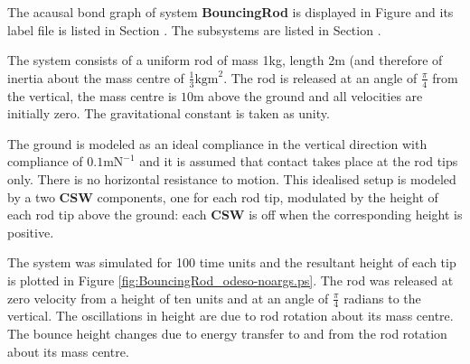 
%

The acausal bond graph of system \textbf{BouncingRod} is displayed in
Figure  and its label file is listed in Section
. 
 The subsystems are listed in Section
.

The system consists of a uniform rod of mass 1kg, length 2m (and
therefore of inertia about the mass centre of $\frac{1}{3}
\text{kgm}^2$. The rod is released at an angle of $\frac{\pi}{4}$ from
the vertical, the mass centre is $10\text{m}$ above the ground and all
velocities are initially zero. The gravitational constant is taken as unity.

The ground is modeled as an ideal compliance in the vertical
direction with compliance of $0.1 \text{mN}^{-1}$ and it is assumed
that contact takes place at the rod tips only. There is no
horizontal resistance to motion. This idealised setup is modeled by a
two {\bf CSW} components, one for each rod tip, modulated by the
height of each rod tip above the ground: each  {\bf CSW} is off when
the corresponding height is positive.

The system was simulated for 100 time units and the resultant height
of each tip is plotted in Figure \ref{fig:BouncingRod_odeso-noargs.ps}. The rod was
released at zero velocity from a height of ten units and at an angle
of $\frac{\pi}{4}$ radians to the vertical. The oscillations in height
are due to rod rotation about its mass centre.  The bounce height
changes due to energy transfer to and from the rod rotation about its
mass centre.




